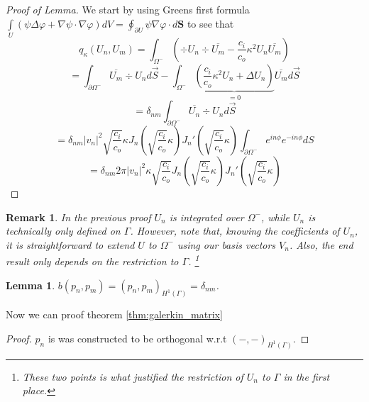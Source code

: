 \documentclass[10pt,journal,compsoc, onecolumn]{IEEEtran}
\newtheorem{lemma}[theorem]{Lemma}
\newtheorem{remark}[theorem]{Remark}
\begin{document}
\begin{proof}[Proof of Lemma]
    We start by using Greens first formula 
    \(\int\limits_{U}(\psi \Delta \varphi+\nabla \psi \cdot \nabla \varphi) d V=\oint_{\partial U} \psi \nabla \varphi \cdot d \mathbf{S}\)
    to see that $$q_\kappa(U_n, U_m) = \int_{\Omega^-} ( \div U_n \div \overline{U_m} -  \frac{c_i}{c_o}\kappa^2U_n \overline{U_m}) $$
    $$
        = \int_{ \partial \Omega^-} \overline{U_m} \div U_n d \vec{S} - \int_{\Omega^{-}} \underbrace{( \frac{c_i}{c_o}\kappa^2 U_n + \Delta U_n)}_{=0} \overline{U_m} d \vec{S} 
    $$
    $$
        = \delta_{nm}\int_{ \partial \Omega^-} \overline{U_n} \div U_n d \vec{S}
    $$
    $$
        = \delta_{nm}|v_n|^2 \sqrt{ \frac{c_i}{c_o}} \kappa  J_n(\sqrt{ \frac{c_i}{c_o}}\kappa ) J_n'(\sqrt{ \frac{c_i}{c_o}}\kappa )  \int_{\partial \Omega^-} e^{in\phi}  e^{-in\phi} dS
    $$
    $$
        = \delta_{nm}2\pi |v_n|^2\kappa \sqrt{ \frac{c_i}{c_o}} J_n(\sqrt{ \frac{c_i}{c_o}} \kappa ) J_n'(\sqrt{ \frac{c_i}{c_o}} \kappa )
    $$
\end{proof}

\begin{remark}
    In the previous proof $U_n$ is integrated over $\Omega^-$, while $U_n$ is technically only defined on $\Gamma$. 
    However, note that, knowing the coefficients of $U_n$, it is straightforward to extend $U$ to $\Omega^-$ using our basis vectors $V_n$. 
    Also, the end result only depends on the restriction to $\Gamma$.
    \footnote{These two points is what justified the restriction of $U_n$ to $\Gamma$ in the first place.}
\end{remark}

\begin{lemma}
    $b(p_n, p_m) =  (p_n, p_m)_{H^1(\Gamma)} = \delta_{nm}$.
\end{lemma}
Now we can proof theorem \ref{thm:galerkin_matrix}
\begin{proof}
    $p_n$ is was constructed to be orthogonal w.r.t $(-, -)_{H^1(\Gamma)}$.
\end{proof}
   
\end{document}
